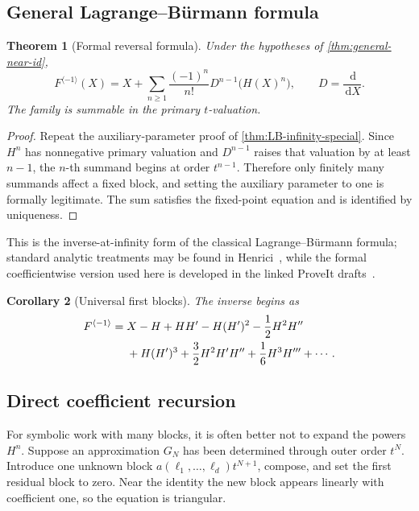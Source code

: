 \documentclass[11pt,a4paper]{article}
\numberwithin{equation}{section}
\newtheorem{theorem}{Theorem}[section]
\newtheorem{corollary}[theorem]{Corollary}
\theoremstyle{definition}
\theoremstyle{remark}
\newcommand{\dd}{\,\mathrm d}
\begin{document}
\subsection{General Lagrange--B\"urmann formula}

\begin{theorem}[Formal reversal formula]\label{thm:general-LB}
Under the hypotheses of \cref{thm:general-near-id},
\begin{equation}\label{eq:general-LB}
  F^{\langle-1\rangle}(X)
  =X+\sum_{n\ge1}\frac{(-1)^n}{n!}
   D^{n-1}\bigl(H(X)^n\bigr),
  \qquad D=\frac{\dd}{\dd X}.
\end{equation}
The family is summable in the primary \(t\)-valuation.
\end{theorem}

\begin{proof}
Repeat the auxiliary-parameter proof of
\cref{thm:LB-infinity-special}.  Since \(H^n\) has nonnegative primary
valuation and \(D^{n-1}\) raises that valuation by at least \(n-1\), the
\(n\)-th summand begins at order \(t^{n-1}\).  Therefore only finitely
many summands affect a fixed block, and setting the auxiliary parameter to
one is formally legitimate.  The sum satisfies the fixed-point equation
and is identified by uniqueness.
\end{proof}

This is the inverse-at-infinity form of the classical Lagrange--B\"urmann
formula; standard analytic treatments may be found in
Henrici~\cite{Henrici}, while the formal coefficientwise version used here
is developed in the linked ProveIt drafts~\cite{ProveItTransseries}.

\begin{corollary}[Universal first blocks]\label{cor:universal-blocks}
The inverse begins as
\begin{align}
 F^{\langle-1\rangle}={}&X-H+HH'
 -H(H')^2-\frac12H^2H''
 \notag\\
 &+H(H')^3+\frac32H^2H'H''+\frac16H^3H'''
 +\cdots.
 \label{eq:universal-blocks-general}
\end{align}
\end{corollary}

\subsection{Direct coefficient recursion}

For symbolic work with many blocks, it is often better not to expand the
powers \(H^n\).  Suppose an approximation \(G_N\) has been determined
through outer order \(t^N\).  Introduce one unknown block
\(a(\ell_1,\ldots,\ell_d)t^{N+1}\), compose, and set the first residual
block to zero.  Near the identity the new block appears linearly with
coefficient one, so the equation is triangular.
\end{document}
